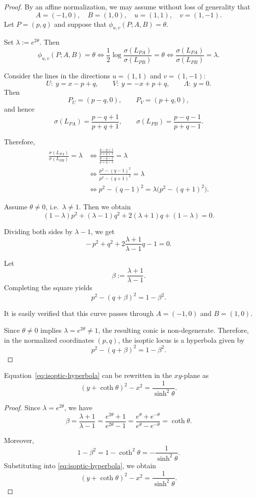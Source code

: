 \documentclass[12pt]{article}
\begin{document}
\begin{proof}
By an affine normalization, we may assume without loss of generality that
\[
A=(-1,0),\quad B=(1,0),\quad u=(1,1),\quad v=(1,-1).
\]
Let $P=(p,q)$ and suppose that $\phi_{u,v}(P;A,B)=\theta$.

Set $\lambda:=e^{2\theta}$. Then
\[
\phi_{u,v}(P;A,B)=\theta
\iff
\frac{1}{2}\log\frac{\sigma(L_{PA})}{\sigma(L_{PB})}=\theta
\iff
\frac{\sigma(L_{PA})}{\sigma(L_{PB})}=\lambda.
\]

Consider the lines in the directions $u=(1,1)$ and $v=(1,-1)$:
\[
U:\ y=x-p+q,\qquad
V:\ y=-x+p+q,\qquad
\Lambda:\ y=0.
\]
Then
\[
P_U=(p-q,0),\qquad
P_V=(p+q,0),
\]
and hence
\[
\sigma(L_{PA})=\frac{p-q+1}{p+q+1},\qquad
\sigma(L_{PB})=\frac{p-q-1}{p+q-1}.
\]

Therefore,
\begin{align*}
\frac{\sigma(L_{PA})}{\sigma(L_{PB})}=\lambda
&\iff
\frac{\frac{p-q+1}{p+q+1}}{\frac{p-q-1}{p+q-1}}=\lambda\\
&\iff
\frac{p^2-(q-1)^2}{p^2-(q+1)^2}=\lambda\\
&\iff
p^2-(q-1)^2=\lambda\bigl(p^2-(q+1)^2\bigr).
\end{align*}

Assume $\theta\neq0$, i.e.\ $\lambda\neq1$.
Then we obtain
\[
(1-\lambda)p^2+(\lambda-1)q^2+2(\lambda+1)q+(1-\lambda)=0.
\]

Dividing both sides by $\lambda-1$, we get
\[
-\,p^2+q^2+2\frac{\lambda+1}{\lambda-1}q-1=0.
\]

Let
\[
\beta:=\frac{\lambda+1}{\lambda-1}.
\]
Completing the square yields
\begin{equation}\label{eq:isoptic-hyperbola}
p^2-(q+\beta)^2=1-\beta^2.
\end{equation}

It is easily verified that this curve passes through
$A=(-1,0)$ and $B=(1,0)$.

Since $\theta\neq0$ implies $\lambda=e^{2\theta}\neq1$,
the resulting conic is non-degenerate.
Therefore, in the normalized coordinates $(p,q)$,
the isoptic locus is a hyperbola given by
\[
p^2-(q+\beta)^2=1-\beta^2.
\]
\end{proof}

\begin{corollary}\label{cor:isoptic-hyperbola-coth}
Equation~\cref{eq:isoptic-hyperbola} can be rewritten in the $xy$-plane as
\[
(y+\coth\theta)^2-x^2=\frac{1}{\sinh^2\theta}.
\]
\end{corollary}

\begin{proof}
Since $\lambda=e^{2\theta}$, we have
\[
\beta=\frac{\lambda+1}{\lambda-1}
=\frac{e^{2\theta}+1}{e^{2\theta}-1}
=\frac{e^{\theta}+e^{-\theta}}{e^{\theta}-e^{-\theta}}
=\coth\theta.
\]

Moreover,
\[
1-\beta^2
=
1-\coth^2\theta
=
-\frac{1}{\sinh^2\theta}.
\]
Substituting into \cref{eq:isoptic-hyperbola}, we obtain
\[
(y+\coth\theta)^2-x^2=\frac{1}{\sinh^2\theta}.
\]
\end{proof}
\end{document}
